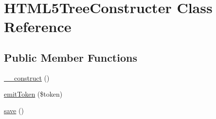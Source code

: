 \hypertarget{classHTML5TreeConstructer}{\section{H\+T\+M\+L5\+Tree\+Constructer Class Reference}
\label{classHTML5TreeConstructer}
}
\subsection*{Public Member Functions}
\begin{DoxyCompactItemize}
\item 
\hyperlink{classHTML5TreeConstructer_a36649232a8af7f8cf49fba9aa7b20db7}{\+\_\+\+\_\+construct} ()
\item 
\hyperlink{classHTML5TreeConstructer_a37515b588cb103a618bdb0bf84fc7bc4}{emit\+Token} (\$token)
\item 
\hyperlink{classHTML5TreeConstructer_a3701007a7652945bb2d267b572bb38cc}{save} ()
\end{DoxyCompactItemize}
